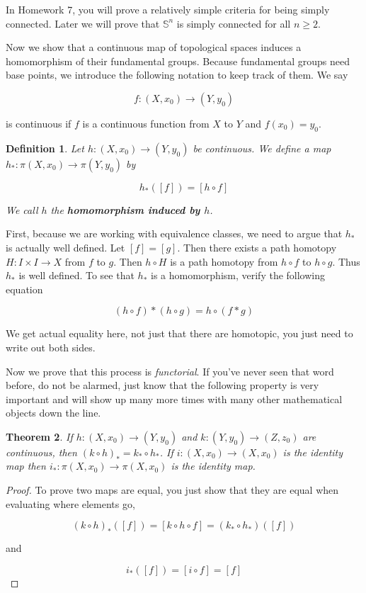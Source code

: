 \documentclass[a4paper]{article}
\newtheorem{theorem}{Theorem}
\newtheorem{definition}[theorem]{Definition}
\numberwithin{theorem}{section}
\begin{document}
In Homework 7, you will prove a relatively simple criteria for being simply connected. Later we will prove that $\mathbb{S}^n$ is simply connected for all $n \geq 2$.

Now we show that a continuous map of topological spaces induces a homomorphism of their fundamental groups. Because fundamental groups need base points, we introduce the following notation to keep track of them. We say 

$$ f: (X,x_0) \rightarrow (Y,y_0) $$

is continuous if $f$ is a continuous function from $X$ to $Y$ and $f(x_0) = y_0$.

\begin{definition}
Let $h: (X,x_0) \rightarrow (Y,y_0)$ be continuous. We define a map $h_*: \pi(X,x_0) \rightarrow \pi(Y,y_0)$ by

$$ h_*([f]) = [h \circ f] $$

We call $h$ the \textbf{homomorphism induced by $h$}. 

\end{definition}

First, because we are working with equivalence classes, we need to argue that $h_*$ is actually well defined. Let $[f] = [g]$. Then there exists a path homotopy $H: I \times I \rightarrow X$ from $f$ to $g$. Then $h \circ H$ is a path homotopy from $h \circ f$ to $h \circ g$. Thus $h_*$ is well defined. To see that $h_*$ is a homomorphism, verify the following equation

$$ (h \circ f) \ast (h \circ g) = h \circ (f \ast g) $$

We get actual equality here, not just that there are homotopic, you just need to write out both sides.

Now we prove that this process is \textit{functorial}. If you've never seen that word before, do not be alarmed, just know that the following property is very important and will show up many more times with many other mathematical objects down the line.

\begin{theorem}
If $h: (X,x_0) \rightarrow (Y,y_0)$ and $k: (Y,y_0) \rightarrow (Z,z_0)$ are continuous, then $(k \circ h)_* = k_* \circ h_*$. If $i: (X,x_0) \rightarrow (X,x_0)$ is the identity map then $i_*: \pi(X,x_0) \rightarrow \pi(X,x_0)$ is the identity map.
\end{theorem}

\begin{proof}
To prove two maps are equal, you just show that they are equal when evaluating where elements go,

$$ (k \circ h)_* ([f]) = [k \circ h \circ f] = (k_* \circ h_*)([f]) $$

and

$$ i_*([f]) = [i \circ f] = [f] $$

\end{proof}
\end{document}

